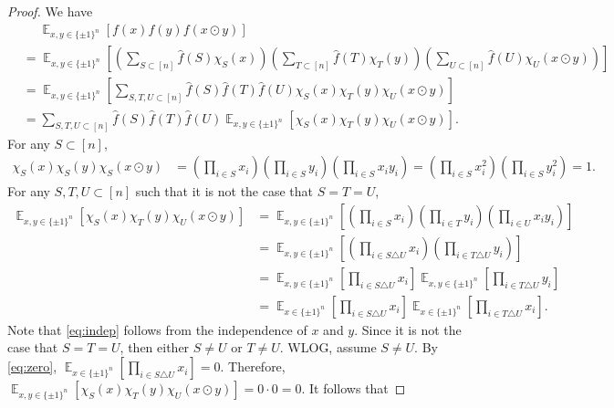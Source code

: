 \documentclass[letterpaper, reqno,11pt]{article}
\newcommand{\EE}{\mathop{{}\mathbb{E}}}
\begin{document}
\begin{proof}
  We have
  \begin{align*}
    &\quad\; \EE_{x, y \in \{ \pm 1 \}^n}[f(x) f(y) f(x \odot y)] \\
    &= \EE_{x, y \in \{ \pm 1 \}^n}\left[\left(\sum_{S \subset [n]} \hat{f}(S) \chi_S(x)\right) \left(\sum_{T \subset [n]} \hat{f}(T) \chi_T(y)\right) \left(\sum_{U \subset [n]} \hat{f}(U) \chi_U(x \odot y)\right)\right] \\
    &= \EE_{x, y \in \{ \pm 1 \}^n}\left[\sum_{S, T, U \subset [n]} \hat{f}(S) \hat{f}(T) \hat{f}(U) \chi_S(x) \chi_T(y) \chi_U(x \odot y)\right] \\
    &= \sum_{S, T, U \subset [n]} \hat{f}(S) \hat{f}(T) \hat{f}(U) \EE_{x, y \in \{ \pm 1 \}^n}\left[\chi_S(x) \chi_T(y) \chi_U(x \odot y)\right].
  \end{align*}
  For any $S \subset [n]$,
  \begin{align*}
    \chi_S(x) \chi_S(y) \chi_S(x \odot y) &= \left(\prod_{i \in S} x_i\right) \left(\prod_{i \in S} y_i\right) \left(\prod_{i \in S} x_i y_i\right) = \left(\prod_{i \in S} x_i^2\right) \left(\prod_{i \in S} y_i^2\right) = 1.
  \end{align*}
  For any $S, T, U \subset [n]$ such that it is not the case that $S = T = U$,
  \begin{align}
    \EE_{x, y \in \{ \pm 1 \}^n}\left[\chi_S(x) \chi_T(y) \chi_U(x \odot y)\right] &= \EE_{x, y \in \{ \pm 1 \}^n}\left[\left(\prod_{i \in S} x_i\right) \left(\prod_{i \in T} y_i\right) \left(\prod_{i \in U} x_i y_i\right)\right] \nonumber \\
    &= \EE_{x, y \in \{ \pm 1 \}^n}\left[\left(\prod_{i \in S \triangle U} x_i\right) \left(\prod_{i \in T \triangle U} y_i\right)\right] \nonumber \\
    &= \EE_{x, y \in \{ \pm 1 \}^n}\left[\prod_{i \in S \triangle U} x_i\right] \EE_{x, y \in \{ \pm 1 \}^n}\left[\prod_{i \in T \triangle U} y_i\right] \label{eq:indep} \\
    &= \EE_{x \in \{ \pm 1 \}^n}\left[\prod_{i \in S \triangle U} x_i\right] \EE_{x \in \{ \pm 1 \}^n}\left[\prod_{i \in T \triangle U} x_i\right]. \nonumber
  \end{align}
  Note that \eqref{eq:indep} follows from the independence of $x$ and $y$. Since it is not the case that $S = T = U$, then either $S \neq U$ or $T \neq U$. WLOG, assume $S \neq U$. By \eqref{eq:zero}, $\EE_{x \in \{ \pm 1 \}^n}[\prod_{i \in S \triangle U} x_i] = 0$. Therefore, $\EE_{x, y \in \{ \pm 1 \}^n}[\chi_S(x) \chi_T(y) \chi_U(x \odot y)] = 0 \cdot 0 = 0$. It follows that

\end{proof}
\end{document}
